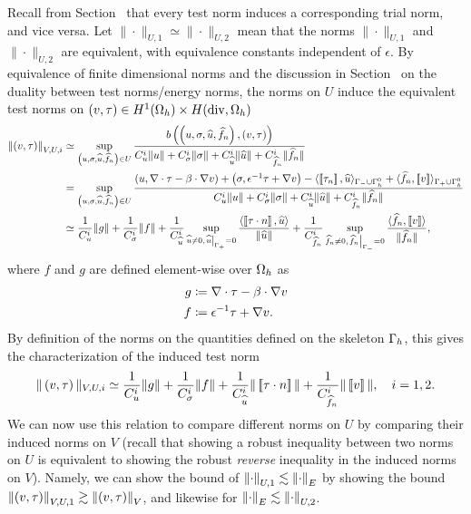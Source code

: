 Recall from Section~ that every test norm induces a corresponding trial norm, and vice versa. Let $\|\cdot\|_{U,1} \simeq \|\cdot\|_{U,2}$ mean that the norms $\|\cdot\|_{U,1}$ and $\|\cdot\|_{U,2}$ are equivalent, with equivalence constants independent of $\epsilon$. By equivalence of finite dimensional norms and the discussion in Section~ on the duality between test norms/energy norms, the norms  on $U$ induce the equivalent test norms on $\left(v,\tau\right) \in H^1(\Oh)\times H({\rm div},\Oh)$
\begin{align*}
\left\|\left(v,\tau\right)\right\|_{V,{U,i}} &\simeq \sup_{\left(u,\sigma,\widehat{u},\widehat{f}_n\right)\in U}\frac{b\left(\left(u,\sigma,\widehat{u},\widehat{f}_n\right),\left(v,\tau\right)\right)}{C_u^i\|u\| + C_\sigma^i\|\sigma\| + C_{\widehat{u}}^i\|\widehat{u}\|+ C_{\widehat{f}_n}^i\|\widehat{f}_n\|}\\
&= \sup_{\left(u,\sigma,\widehat{u},\widehat{f}_n\right)\in U}\frac{\left(u,\div \tau - \beta \cdot \grad v\right) + \left(\sigma, \epsilon^{-1} \tau + \grad v\right) - \langle \jump{\tau_n}, \widehat{u} \rangle_{\Gamma_-\cup \Gh^0} + \langle \widehat{f}_n, \jump{v} \rangle_{\Gamma_+ \cup \Gh^0}}{C_u^i\|u\| + C_\sigma^i\|\sigma\| + C_{\widehat{u}}^i\|\widehat{u}\|+ C_{\widehat{f}_n}^i\|\widehat{f}_n\|}\\
& \simeq \frac{1}{C_u^i}\|g\| + \frac{1}{C_\sigma^i}\|f\| + \frac{1}{C_{\widehat{u}}^i}\sup_{\widehat{u}\neq 0, \left.\widehat{u}\right|_{\Gamma_+} = 0} \frac{\langle \jump{\tau\cdot n}, \widehat{u}\rangle}{\|\widehat{u}\|} +\frac{1}{C_{\widehat{f}_n}^i}\sup_{\widehat{f}_n\neq 0, \left.\widehat{f}_n\right|_{\Gamma_-}=0}\frac{\langle \widehat{f}_n, \jump{v}\rangle}{\|\widehat{f}_n\|},
\end{align*}
where $f$ and $g$ are defined element-wise over $\Oh$ as 
\begin{align*}
g &\coloneqq \div \tau - \beta \cdot \grad v\\
f &\coloneqq \epsilon^{-1}\tau + \grad v.
\end{align*}
By definition of the norms on the quantities defined on the skeleton $\Gh$, this gives the characterization of the induced test norm 
\[
\|\left(v,\tau\right)\|_{V,{U,i}} \simeq \frac{1}{C_u^i}\|g\| + \frac{1}{C_\sigma^i}\|f\| + \frac{1}{C_{\widehat{u}}^i}\|\jump{\tau\cdot n}\| + \frac{1}{C_{\widehat{f}_n}^i}\|\jump{v}\|, \quad i = 1,2.
\]
We can now use this relation to compare different norms on $U$ by comparing their induced norms on $V$ (recall that showing a robust inequality between two norms on $U$ is equivalent to showing the robust \textit{reverse} inequality in the induced norms on $V$). Namely, we can show the bound of $\nor{\cdot}_{U,1} \lesssim \nor{\cdot}_E$ by showing the bound $\nor{\left(v,\tau\right)}_{V,U,1} \gtrsim \nor{\left(v,\tau\right)}_{V}$, and likewise for $\nor{\cdot}_E \lesssim \nor{\cdot}_{U,2}$. 

